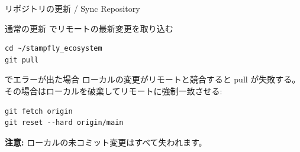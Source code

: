 \documentclass[aspectratio=169, 14pt]{beamer}
\begin{document}
\begin{frame}[fragile]{リポジトリの更新 / Sync Repository}
  \vspace{-0.3em}

  \begin{block}{通常の更新}
    {\small {} でリモートの最新変更を取り込む}
  \end{block}

  \vspace{-0.3em}

  \begin{lstlisting}[style=sfcpp]
cd ~/stampfly_ecosystem
git pull
  \end{lstlisting}

  \vspace{-0.2em}

  \begin{alertblock}{ でエラーが出た場合}
    {\footnotesize ローカルの変更がリモートと競合すると pull が失敗する。
    その場合はローカルを破棄してリモートに強制一致させる:}
  \end{alertblock}

  \vspace{-0.3em}

  \begin{lstlisting}[style=sfcpp]
git fetch origin
git reset --hard origin/main
  \end{lstlisting}

  \vspace{-0.2em}

  {\scriptsize
  \textbf{注意:} ローカルの未コミット変更はすべて失われます。
  }
\end{frame}
\end{document}
